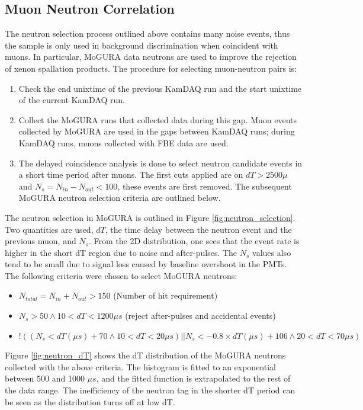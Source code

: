\subsection{Muon Neutron Correlation}
The neutron selection process outlined above contains many noise events, thus the sample is only used in background discrimination when coincident with muons. In particular, MoGURA data neutrons are used to improve the rejection of xenon spallation products. The procedure for selecting muon-neutron pairs is:
\begin{enumerate}
	\item Check the end unixtime of the previous KamDAQ run and the start unixtime of the current KamDAQ run.
	\item Collect the MoGURA runs that collected data during this gap. Muon events collected by MoGURA are used in the gaps between KamDAQ runs; during KamDAQ runs, muons collected with FBE data are used.
	\item The delayed coincidence analysis is done to select neutron candidate events in a short time period after muons. The first cuts applied are on $dT>2500\mu $ and $N_{s}=N_{in}-N_{out}<100$, these events are first removed. The subsequent MoGURA neutron selection criteria are outlined below.  
\end{enumerate}

The neutron selection in MoGURA is outlined in Figure \ref{fig:neutron_selection}. Two quantities are used, $dT$, the time delay between the neutron event and the previous muon, and $N_s$. From the 2D distribution, one sees that the event rate is higher in the short dT region due to noise and after-pulses. The $N_s$ values also tend to be small due to signal loss caused by baseline overshoot in the PMTs. The following criteria were chosen to select MoGURA neutrons:
\begin{itemize}
	\item $N_{total}=N_{in}+N_{out}>150$ (Number of hit requirement)
	\item $N_s>50 \wedge 10<dT<1200\mu s $ (reject after-pulses and accidental events)
	\item $!((N_s<dT(\mu s)+70\wedge 10<dT<20 \mu s )||N_s<-0.8\times dT(\mu s)+106\wedge20<dT<70\mu s)$
\end{itemize}
Figure \ref{fig:neutron_dT} shows the dT distribution of the MoGURA neutrons collected with the above criteria. The histogram is fitted to an exponential between 500 and 1000 $\mu s$, and the fitted function is extrapolated to the rest of the data range. The inefficiency of the neutron tag in the shorter dT period can be seen as the distribution turns off at low dT.

